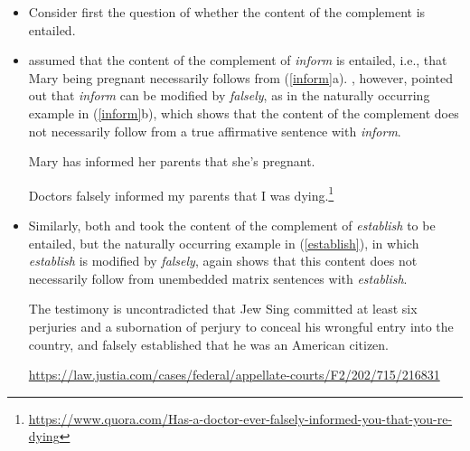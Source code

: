 \documentclass[11pt,fleqn]{article}
\newcommand{\6}{\mbox{$[\hspace*{-.6mm}[$}}
\newcommand{\9}{\mbox{$]\hspace*{-.6mm}]$}}
\begin{document}
\begin{itemize}

\item Consider first the question of whether the content of the complement is entailed. 

\item \citet[139]{schlenker10} assumed that the content of the complement of {\em inform} is entailed, i.e., that Mary being pregnant necessarily follows from (\ref{inform}a). \citet[76]{anand-hacquard2014}, however, pointed out that {\em inform} can be modified by {\em falsely}, as in the naturally occurring example in (\ref{inform}b), which shows that the content of the complement does not necessarily follow from a true affirmative sentence with {\em inform}.

\begin{exe}
\ex\label{inform} 

\begin{xlist}

\ex Mary has informed her parents that she's pregnant.

\ex Doctors falsely informed my parents that I was dying.\footnote{\url{https://www.quora.com/Has-a-doctor-ever-falsely-informed-you-that-you-re-dying}}

\end{xlist}
\end{exe}

\item Similarly, both \citet{wyse} and \citet{swanson2012} took the content of the complement of {\em establish} to be entailed, but the naturally occurring example in (\ref{establish}), in which {\em establish} is  modified by {\em falsely}, again shows that this content does not necessarily follow from unembedded matrix sentences with {\em establish}. 

\begin{exe}
\ex\label{establish} The testimony is uncontradicted that Jew Sing committed at least six perjuries and a subornation of perjury to conceal his wrongful entry into the country, and falsely established that he was an American citizen. \hfill \begin{footnotesize}\url{https://law.justia.com/cases/federal/appellate-courts/F2/202/715/216831}\end{footnotesize}
\end{exe}



\end{itemize}
\end{document}
